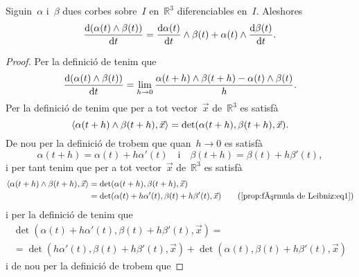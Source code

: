\documentclass[../../main.tex]{subfiles}
\begin{document}
    \begin{proposition}
        \label{prop:fórmula de Leibniz}
        \label{prop:fórmula per la derivada del producte vectorial de dues corbes}
        Siguin~\(\alpha\) i~\(\beta\) dues corbes sobre~\(I\) en~\(\mathbb{R}^{3}\) diferenciables en~\(I\).
        Aleshores
        \[
            \frac{\mathop{}\!\mathrm{d}(\alpha(t)\mathbin{\wedge}\beta(t))}{\mathop{}\!\mathrm{d} t}=\frac{\mathop{}\!\mathrm{d}\alpha(t)}{\mathop{}\!\mathrm{d} t}\mathbin{\wedge}\beta(t)+\alpha(t)\mathbin{\wedge}\frac{\mathop{}\!\mathrm{d}\beta(t)}{\mathop{}\!\mathrm{d} t}.
        \]
        \begin{proof}
            Per la definició de  tenim que
            \begin{equation}
                \label{prop:fórmula de Leibniz:eq2}
                \frac{\mathop{}\!\mathrm{d}(\alpha(t)\mathbin{\wedge}\beta(t))}{\mathop{}\!\mathrm{d} t}=\lim_{h\to0}\frac{\alpha(t+h)\mathbin{\wedge}\beta(t+h)-\alpha(t)\mathbin{\wedge}\beta(t)}{h}.
            \end{equation}
            Per la definició de  tenim que per a tot vector~\(\vec{x}\) de~\(\mathbb{R}^{3}\) es satisfà
            \[
                \prodesc{\alpha(t+h)\prodvec\beta(t+h)}{\vec{x}}=\det(\alpha(t+h),\beta(t+h),\vec{x}).
            \]
            De nou per la definició de  trobem que quan~\(h\to0\) es satisfà
            \begin{equation}
                \label{prop:fórmula de Leibniz:eq1}
                \alpha(t+h)=\alpha(t)+h\alpha'(t)\quad\text{i}\quad\beta(t+h)=\beta(t)+h\beta'(t),
            \end{equation}
            i per tant tenim que per a tot vector~\(\vec{x}\) de~\(\mathbb{R}^{3}\) es satisfà
            \begin{align*}
                \prodesc{\alpha(t+h)\prodvec\beta(t+h)}{\vec{x}}&=\det(\alpha(t+h),\beta(t+h),\vec{x}) \\
                &=\det(\alpha(t)+h\alpha'(t),\beta(t)+h\beta'(t),\vec{x}) \tag{\ref{prop:fórmula de Leibniz:eq1}}
            \end{align*}
            i per la definició de  tenim que
            \begin{multline*}
                \det(\alpha(t)+h\alpha'(t),\beta(t)+h\beta'(t),\vec{x})=\\
                =\det(h\alpha'(t),\beta(t)+h\beta'(t),\vec{x})+\det(\alpha(t),\beta(t)+h\beta'(t),\vec{x})
            \end{multline*}
            i de nou per la definició de  trobem que

\end{proof}
\end{proposition}
\end{document}
